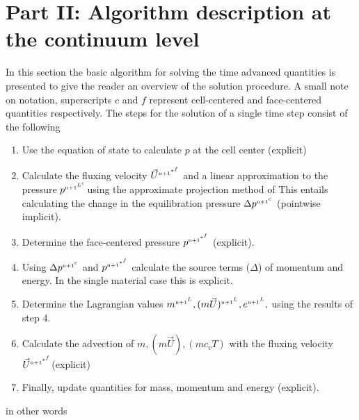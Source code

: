 \documentclass[fleqn]{article}
\begin{document}
\section{\textsf{Part II: Algorithm description at the continuum level}}
In this section the basic algorithm for solving the time advanced quantities
is presented to give the reader an overview of the solution procedure.
A small note on notation, superscripts $c$ and $f$ represent cell-centered
and face-centered quantities respectively.  The steps for the solution of
a single time step consist of the following
\sffamily
\begin{enumerate}
%
\item {\label{step1}Use the equation of state to calculate $p$ at the cell center (explicit) }
%
\item {\label{step2}Calculate the fluxing velocity $\ustar$ and a linear approximation to the pressure $\pnnLc$using the approximate projection method of   This entails calculating the change in the equilibration pressure $\delpc$ (pointwise implicit).}
%
\item {\label{step3}Determine the face-centered pressure $\pstar$ (explicit).}
%
\item {\label{step4}Using $\delpc$ and $\pstar$ calculate the source terms ($\Delta$) of momentum and energy.  In the single material case this is explicit.}
%
\item {\label{step5}Determine the Lagrangian values $ \massnnL,\momnnL,\engnnL,$ using the results of step 4.}
%
\item {\label{step6}Calculate the advection of $m, (m\vec{U}), (m c_vT)$ with the fluxing velocity $\ustar$(explicit)}
%
\item {\label{step7}Finally, update quantities for mass, momentum and energy (explicit).}
\end{enumerate}
\normalfont 
%
%
in other words 
\sffamily
\end{document}
